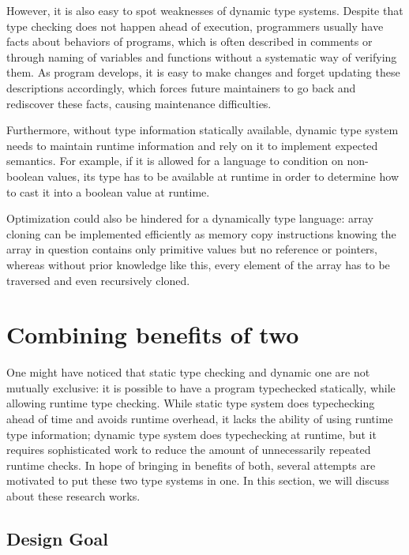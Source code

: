 However, it is also easy to spot weaknesses of dynamic type systems.
Despite that type checking does not happen ahead of execution,
programmers usually have facts about behaviors of programs,
which is often described in comments or through naming of variables and functions without a systematic way of verifying them.
As program develops, it is easy to make changes and forget updating these descriptions accordingly, which forces future maintainers to go back and rediscover these facts, causing maintenance difficulties.


Furthermore, without type information statically available,
dynamic type system needs to maintain runtime information
and rely on it to implement expected semantics.
For example, if it is allowed for a language to condition on non-boolean values,
its type has to be available at runtime in order to
determine how to cast it into a boolean value at runtime.

Optimization could also be hindered for a dynamically type language: 
array cloning can be implemented efficiently as memory copy instructions knowing the array in question contains only primitive values but no reference or pointers, whereas without prior knowledge like this, every element of the array has to be traversed and even recursively cloned.


\section{Combining benefits of two}


One might have noticed that static type checking and dynamic one
are not mutually exclusive: it is possible to have a program typechecked
statically, while allowing runtime type checking.
While static type system does typechecking ahead of time
and avoids runtime overhead,
it lacks the ability of using runtime type information;
dynamic type system does typechecking at runtime,
but it requires sophisticated work to reduce the amount of
unnecessarily repeated runtime checks.
In hope of bringing in benefits of both,
several attempts are motivated to put these two type systems in one.
In this section, we will discuss about these research works.

\subsection{Design Goal}


